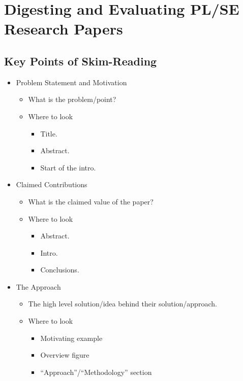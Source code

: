 \documentclass{article}
\begin{document}
\section{Digesting and Evaluating PL/SE Research Papers}

\subsection{Key Points of Skim-Reading}

\begin{itemize}
    \item Problem Statement and Motivation
    \begin{itemize}
        \item What is the problem/point?
        \item Where to look
        \begin{itemize}
            \item Title.
            \item Abstract.
            \item Start of the intro.
        \end{itemize}
    \end{itemize}
    \item Claimed Contributions
    \begin{itemize}
        \item What is the claimed value of the paper?
        \item Where to look
        \begin{itemize}
            \item Abstract.
            \item Intro.
            \item Conclusions.
        \end{itemize}
    \end{itemize}
    \item The Approach
    \begin{itemize}
        \item The high level solution/idea behind their solution/approach.
        \item Where to look
        \begin{itemize}
            \item Motivating example
            \item Overview figure
            \item ``Approach''/``Methodology'' section
            \begin{itemize}

\end{itemize}
\end{itemize}
\end{itemize}
\end{itemize}
\end{document}
